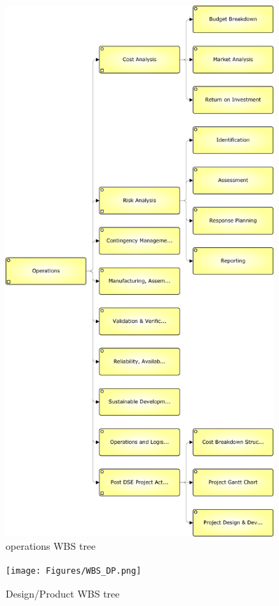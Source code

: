 \documentclass[a4paper]{report}
\begin{document}
\begin{figure}
\label{fig:WBSO}
\centering
\includegraphics[height=20cm]{Figures/WBS_O.png}

\caption{operations WBS tree}
\end{figure}






\begin{figure}
\label{fig:WBSDP}
\centering
\texttt{[image: Figures/WBS\_DP.png]}

\caption{Design/Product WBS tree}
\end{figure}
\end{document}

